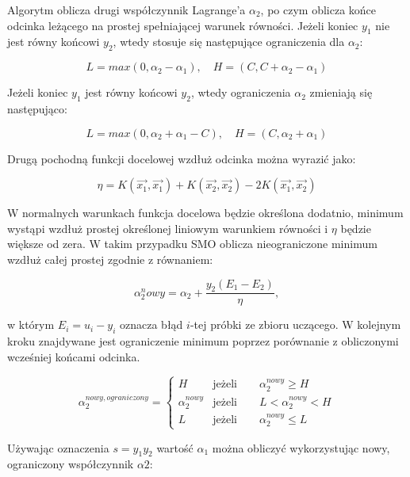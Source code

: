 \documentclass[[10pt,a4paper]{article}
\begin{document}
Algorytm oblicza drugi współczynnik  Lagrange'a $\alpha_{2}$, po czym oblicza końce odcinka leżącego na prostej spełniającej warunek równości. Jeżeli koniec $y_1$ nie jest równy końcowi $y_2$, wtedy stosuje się następujące ograniczenia dla $\alpha_2$:

\begin{equation}
L = max(0,\alpha_2 - \alpha_1),\quad H = (C,C + \alpha_2 - \alpha_1)
\end{equation}

Jeżeli koniec $y_1$ jest równy końcowi $y_2$, wtedy ograniczenia $\alpha_2$ zmieniają się następująco:

\begin{equation}
L = max(0,\alpha_2 + \alpha_1 - C),\quad H = (C, \alpha_2 + \alpha_1)
\end{equation}

Drugą pochodną funkcji docelowej wzdłuż odcinka można wyrazić jako:

\begin{equation}
\eta = K(\overrightarrow{x_1},\overrightarrow{x_1}) + K(\overrightarrow{x_2},\overrightarrow{x_2}) - 2K(\overrightarrow{x_1},\overrightarrow{x_2})
\end{equation}

W normalnych warunkach funkcja docelowa będzie określona dodatnio, minimum wystąpi wzdłuż prostej określonej liniowym warunkiem równości i $\eta$ będzie większe od zera. W takim przypadku SMO oblicza nieograniczone minimum wzdłuż całej prostej zgodnie z równaniem:

\begin{equation}
\label{alfa2nowy}
\alpha_2^nowy = \alpha_2 + \frac{y_2(E_1-E_2)}{\eta},
\end{equation}

w którym $E_i = u_i - y_i$ oznacza błąd $i$-tej próbki ze zbioru uczącego. W kolejnym kroku znajdywane jest ograniczenie minimum poprzez porównanie z obliczonymi wcześniej końcami odcinka.

\begin{equation}
\alpha_2^{nowy,ograniczony} =  \begin{cases} 
H & \text{jeżeli} \qquad \alpha_2^{nowy} \geq H \\
\alpha_2^{nowy} & \text{jeżeli} \qquad L < \alpha_2^{nowy} < H \\
L & \text{jeżeli} \qquad \alpha_2^{nowy} \leq L
\end{cases}
\end{equation}

Używając oznaczenia $s=y_1 y_2$ wartość $\alpha_1$ można obliczyć wykorzystując nowy, ograniczony współczynnik $\alpha2$:
\end{document}

